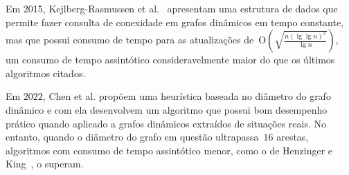 Em 2015, Kejlberg-Rasmussen et al.~\cite{kejlbergrasmussen_et_al} apresentam uma estrutura de dados que permite fazer consulta de conexidade em grafos dinâmicos em tempo constante, mas que possui consumo de tempo para as atualizações de~$\mathrm{O}\left(\sqrt{\frac{n\left(\lg \lg n\right)^2}{\lg n}}\right)$, um consumo de tempo assintótico consideravelmente maior do que os últimos algoritmos citados.

Em $2022$, Chen et al. \cite{QC22} propõem uma heurística baseada no diâmetro do grafo dinâmico e com ela desenvolvem um algoritmo que possui bom desempenho prático quando aplicado a grafos dinâmicos extraídos de situações reais.
No entanto, quando o diâmetro do grafo em questão ultrapassa~$16$ arestas, algoritmos com consumo de tempo assintótico menor, como o de Henzinger e King~\cite{HenzingerKing}, o superam.

\begin{comment}
Em $2022$, Bader e Burkhardt~\cite{simpleAndEfficient2022} introduzem a primeira solução eficiente para um problema tangente ao de MSF. Neste problema, dado um grafo ponderado com $n$ vértices e $m$ arestas e uma dada MSF dele, é quisto encontrar, para cada aresta da MSF, uma aresta que a substituiria em caso de sua remoção. O consumo de tempo dessa solução é~$\O{m+n}$.
\end{comment}
